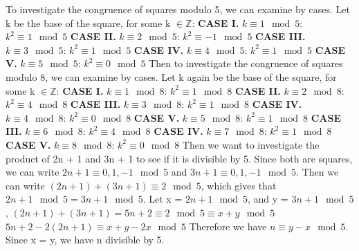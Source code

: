 \documentclass[12pt,letterpaper]{hmcpset}
\begin{document}
\begin{solution} To investigate the congruence of squares modulo 5, we can examine by cases. Let k be the base of the square, for some k $\in\mathbb{Z}$:
\newline \textbf{CASE I.} $k\equiv 1 \mod 5$:
$k^{2} \equiv 1\mod 5$
\newline \textbf{CASE II.} $k\equiv 2 \mod 5$:
$k^{2} \equiv -1\mod 5$
\newline \textbf{CASE III.} $k\equiv 3 \mod 5$:
$k^{2} \equiv 1\mod 5$
\newline \textbf{CASE IV.} $k\equiv 4 \mod 5$:
$k^{2} \equiv 1\mod 5$
\newline \textbf{CASE V.} $k\equiv 5 \mod 5$:
$k^{2} \equiv 0\mod 5$
\newline\newline Then to investigate the congruence of squares modulo 8, we can examine by cases. Let k again be the base of the square, for some k $\in\mathbb{Z}$:
\newline \textbf{CASE I.} $k\equiv 1 \mod 8$:
$k^{2} \equiv 1\mod 8$
\newline \textbf{CASE II.} $k\equiv 2 \mod 8$:
$k^{2} \equiv 4\mod 8$
\newline \textbf{CASE III.} $k\equiv 3 \mod 8$:
$k^{2} \equiv 1\mod 8$
\newline \textbf{CASE IV.} $k\equiv 4 \mod 8$:
$k^{2} \equiv 0\mod 8$
\newline \textbf{CASE V.} $k\equiv 5 \mod 8$:
$k^{2} \equiv 1\mod 8$
\newline \textbf{CASE III.} $k\equiv 6 \mod 8$:
$k^{2} \equiv 4\mod 8$
\newline \textbf{CASE IV.} $k\equiv 7 \mod 8$:
$k^{2} \equiv 1\mod 8$
\newline \textbf{CASE V.} $k\equiv 8 \mod 8$:
$k^{2} \equiv 0\mod 8$
\newline
\newline Then we want to investigate the product of 2n + 1 and 3n + 1 to see if it is divisible by 5. Since both are squares, we can write $2n + 1 \equiv {0, 1, -1} \mod 5$ and $3n + 1 \equiv {0, 1, -1} \mod 5$. Then we can write $(2n+1)+(3n+1)\equiv 2 \mod 5$, which gives that $2n + 1 \mod 5 = 3n + 1 \mod 5$. 
\newline Let x = $2n + 1 \mod 5$, and y = $3n + 1 \mod 5$, 
\newline $(2n+1)+(3n+1) = 5n + 2 \equiv 2 \mod 5 \equiv x + y \mod 5$
\newline $5n + 2 - 2(2n+1)  \equiv x + y - 2x \mod 5$
\newline Therefore we have $n \equiv y - x \mod 5$. Since x = y, we have n divisible by 5. 

\end{solution}
\end{document}
